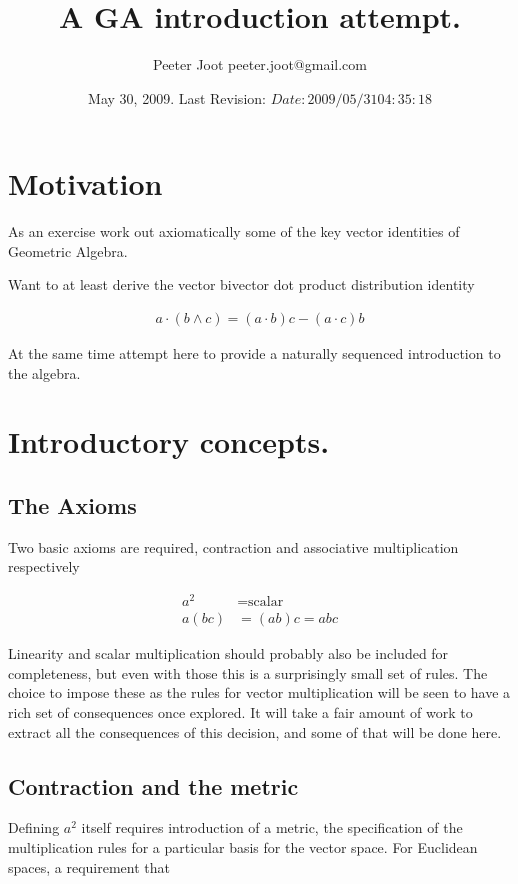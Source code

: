 \documentclass{article}
\title{ A GA introduction attempt. }
\author{Peeter Joot \quad peeter.joot@gmail.com }
\date{ May 30, 2009.  Last Revision: $Date: 2009/05/31 04:35:18 $ }
\begin{document}
\maketitle{}
\tableofcontents

\section{ Motivation }

As an exercise work out axiomatically some of the key vector identities of Geometric Algebra.

Want to at least derive the vector bivector dot product distribution
identity

\begin{align}
a \cdot ( b \wedge c) = (a \cdot b) c - (a \cdot c) b
\end{align}

At the same time attempt here to provide a naturally sequenced introduction to the algebra.

\section{ Introductory concepts. }

\subsection{ The Axioms }

Two basic axioms are required, contraction and associative multiplication respectively

\begin{align}
a^2 &= \text{scalar} \\
a (b c) &= (a b) c = a b c
\end{align}

Linearity and scalar multiplication should probably also be included for completeness, but even with those this is a surprisingly small set of rules.  The choice to impose these as the rules for vector multiplication will be seen to have a rich set of consequences once explored.  It will take a fair amount of work to extract all the consequences of this decision, and some of that will be done here.

\subsection{ Contraction and the metric }

Defining $a^2$ itself requires introduction of a metric, the specification of the multiplication rules for a particular basis for the vector space.  For Euclidean spaces, a requirement that
\end{document}
